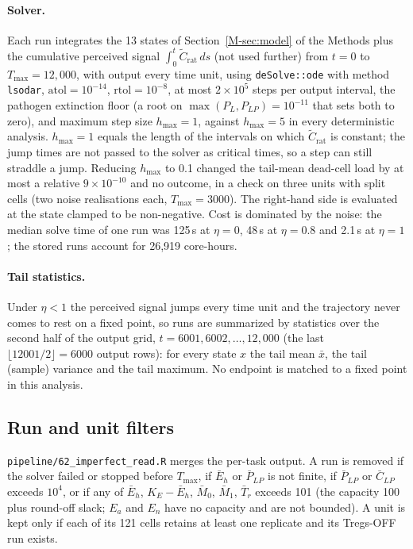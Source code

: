 \documentclass[11pt]{article}
\begin{document}
\paragraph{Solver.}
Each run integrates the 13 states of Section~\ref{M-sec:model} of the Methods plus the
cumulative perceived signal $\int_0^t \tilde C_{\mathrm{rat}}\,ds$ (not used
further) from $t = 0$ to $T_{\max} = 12{,}000$, with output every time unit, using
\texttt{deSolve::ode} with method \texttt{lsodar}, $\mathrm{atol} = 10^{-14}$,
$\mathrm{rtol} = 10^{-8}$, at most $2\times10^{5}$ steps per output interval, the
pathogen extinction floor (a root on $\max(P_L, P_{LP}) = 10^{-11}$ that sets
both to zero), and maximum step size $h_{\max} = 1$, against $h_{\max} = 5$ in
every deterministic analysis. $h_{\max} = 1$ equals the length of the
intervals on which $\tilde C_{\mathrm{rat}}$ is constant; the jump times are not
passed to the solver as critical times, so a step can still straddle a jump.
Reducing $h_{\max}$ to 0.1 changed the tail-mean dead-cell load by at most a
relative $9\times10^{-10}$ and no outcome, in a check on three units with split
cells (two noise realisations each, $T_{\max} = 3000$).
The right-hand side is evaluated at the state clamped to be non-negative.
Cost is dominated by the noise: the median solve time of one run was 125\,s at
$\eta = 0$, 48\,s at $\eta = 0.8$ and 2.1\,s at $\eta = 1$; the stored runs
account for 26,919 core-hours.

\paragraph{Tail statistics.}
Under $\eta < 1$ the perceived signal jumps every time unit and the trajectory
never comes to rest on a fixed point, so runs are summarized by statistics over
the second half of the output grid, $t = 6001, 6002, \dots, 12{,}000$ (the last
$\lfloor 12001/2\rfloor = 6000$ output rows): for every state $x$ the tail mean
$\bar x$, the tail (sample) variance and the tail maximum. No endpoint is
matched to a fixed point in this analysis.

\subsection{Run and unit filters}

\texttt{pipeline/62\_imperfect\_read.R} merges the per-task output. A run is
removed if the solver failed or stopped before $T_{\max}$, if $\bar E_h$ or
$\bar P_{LP}$ is not finite, if $\bar P_{LP}$ or $\bar C_{LP}$ exceeds $10^4$,
or if any of $\bar E_h$, $K_E - \bar E_h$, $\bar M_0$, $\bar M_1$, $\bar T_r$
exceeds 101 (the capacity 100 plus round-off slack; $E_a$ and $E_n$ have no
capacity and are not bounded). A unit is kept only if each of its 121 cells
retains at least one replicate and its Tregs-OFF run exists.
\end{document}

